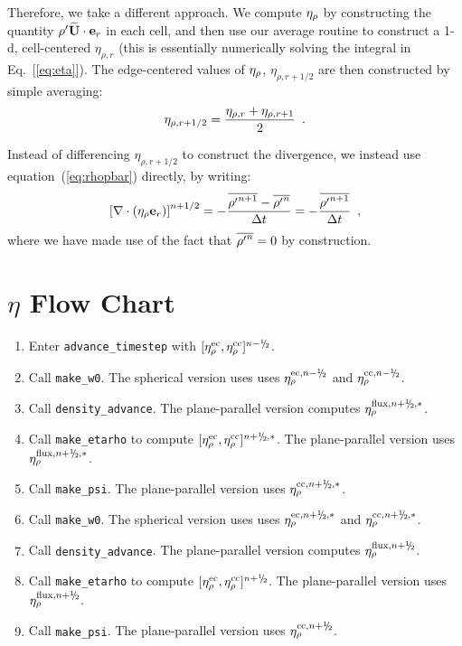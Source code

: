 Therefore, we take a different approach.  We compute $\eta_{\rho}$ by
constructing the quantity ${\rho^{\prime}} \widetilde{{\bf U}} \cdot \mathbf{e}_r$ in each cell, and then
use our average routine to construct a 1-d, cell-centered
$\eta_{\rho,r}$ (this is essentially numerically solving the integral
in Eq.~[\ref{eq:eta}]).  The edge-centered values of $\eta_{\rho}$,
$\eta_{\rho,r+1/2}$ are then constructed by simple
averaging: 
\begin{equation}
\eta_{\rho,r+1/2} = \frac{\eta_{\rho,r} + \eta_{\rho,r+1}}{2} \enskip .
\end{equation}

Instead of differencing $\eta_{\rho,r+1/2}$ to construct the 
divergence, we instead use equation~(\ref{eq:rhopbar}) directly, by writing:
\begin{equation}
\left [ \nabla \cdot (\eta_{\rho} \mathbf{e}_r ) \right ]^{n+1/2}
= - \frac{\overline{{\rho^{\prime}}^{n+1}} - \overline{{\rho^{\prime}}^n}}{\Delta t}
= - \frac{\overline{{\rho^{\prime}}^{n+1}}}{\Delta t} \enskip ,
\end{equation}
where we have made use of the fact that $\overline{{\rho^{\prime}}^n} = 0$ by construction.


\section{$\eta$ Flow Chart}
\begin{enumerate}
\item Enter {\tt advance\_timestep} with $[\etarhoec, \etarhocc]^{n-\myhalf}$.
\item Call {\tt make\_w0}.  The spherical version uses uses $\etarho^{{\rm ec},n-\myhalf}$ and $\etarho^{{\rm cc},n-\myhalf}$.
\item Call {\tt density\_advance}.  The plane-parallel version computes $\etarho^{{\rm flux},n+\myhalf,*}$.
\item Call {\tt make\_etarho} to compute $[\etarhoec, \etarhocc]^{n+\myhalf,*}$.  The plane-parallel version uses $\etarho^{{\rm flux},n+\myhalf,*}$.
\item Call {\tt make\_psi}.  The plane-parallel version uses $\etarho^{{\rm cc},n+\myhalf,*}$.
\item Call {\tt make\_w0}.  The spherical version uses uses $\etarho^{{\rm ec},n+\myhalf,*}$ and $\etarho^{{\rm cc},n+\myhalf,*}$.
\item Call {\tt density\_advance}.  The plane-parallel version computes $\etarho^{{\rm flux},n+\myhalf}$.
\item Call {\tt make\_etarho} to compute $[\etarhoec, \etarhocc]^{n+\myhalf}$.  The plane-parallel version uses $\etarho^{{\rm flux},n+\myhalf}$.
\item Call {\tt make\_psi}.  The plane-parallel version uses $\etarho^{{\rm cc},n+\myhalf}$.
\end{enumerate}

